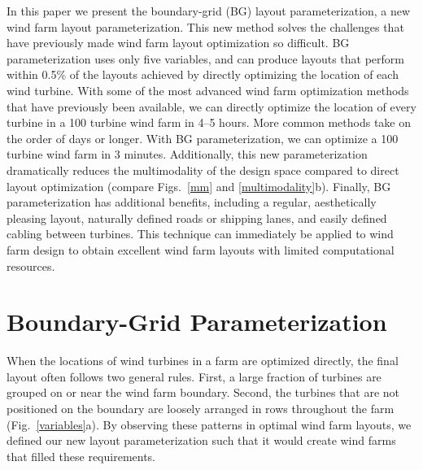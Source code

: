 \documentclass[wes, manuscript]{copernicus}
\begin{document}
In this paper we present the boundary-grid (BG) layout parameterization, a new wind farm layout parameterization. This new method solves the challenges that have previously made wind farm layout optimization so difficult. BG parameterization uses only five variables, and can produce layouts that perform within 0.5\% of the layouts achieved by directly optimizing the location of each wind turbine. 
With some of the most advanced wind farm optimization methods that have previously been available, we can directly optimize the location of every turbine in a 100 turbine wind farm in 4--5 hours. More common methods take on the order of days or longer. With BG parameterization, we can optimize a 100 turbine wind farm in 3 minutes. Additionally, this new parameterization dramatically reduces the multimodality of the design space compared to direct layout optimization (compare Figs.~\ref{mm} and \ref{multimodality}b). Finally, BG parameterization has additional benefits, including a regular, aesthetically pleasing layout, naturally defined roads or shipping lanes, and easily defined cabling between turbines. This technique can immediately be applied to wind farm design to obtain excellent wind farm layouts with limited computational resources.


\section{Boundary-Grid Parameterization}
When the locations of wind turbines in a farm are optimized directly, the final layout often follows two general rules. First, a large fraction of turbines are grouped on or near the wind farm boundary. Second, the turbines that are not positioned on the boundary are loosely arranged in rows throughout the farm (Fig.~\ref{variables}a). 
By observing these patterns in optimal wind farm layouts, we defined our new layout parameterization such that it would create wind farms that filled these requirements.
\end{document}
